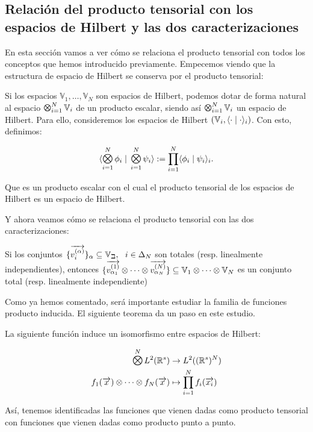 \subsection{Relación del producto tensorial con los espacios de Hilbert y las dos caracterizaciones}

En esta sección vamos a ver cómo se relaciona el producto tensorial con todos los conceptos que hemos introducido previamente. Empecemos viendo que la estructura de espacio de Hilbert se conserva por el producto tensorial:

\begin{proposicion}

	Si los espacios $\mathbb{V}_1, \ldots, \mathbb{V}_N$ son espacios de Hilbert, podemos dotar de forma natural al espacio $\MediumOtimes_{i = 1}^N \mathbb{V}_i$ de un producto escalar, siendo así $\MediumOtimes_{i = 1}^N \mathbb{V}_i$ un espacio de Hilbert. Para ello, consideremos los espacios de Hilbert  $(\mathbb{V}_i, \langle \cdot \; | \; \cdot \rangle_i)$. Con esto, definimos:

	\begin{equation}
		\innerproduct{\MediumOtimes_{i = 1}^{N} \phi_i}{\MediumOtimes_{i = 1}^{N} \psi_i} := \prod_{i = 1}^{N} \innerproduct{\phi_i}{\psi_i}_i.
	\end{equation}

	Que es un producto escalar con el cual el producto tensorial de los espacios de Hilbert es un espacio de Hilbert.

\end{proposicion}

Y ahora veamos cómo se relaciona el producto tensorial con las dos caracterizaciones:

\begin{proposicion}
	Si los conjuntos $\{\overrightarrow{v_i^{(\alpha)}}\}_{\alpha} \subseteq \mathbb{V_i}, \ \  i \in \Delta_{N}$ son totales (resp. linealmente independientes), entonces $\{ \overrightarrow{v^{(1)}_{\alpha_1}} \otimes \cdots \otimes  \overrightarrow{v^{(N)}_{\alpha_N}}  \} \subseteq \mathbb{V}_1 \otimes \cdots \otimes \mathbb{V}_N$ es un conjunto total (resp. linealmente independiente)
\end{proposicion}

Como ya hemos comentado, será importante estudiar la familia de funciones producto inducida. El siguiente teorema da un paso en este estudio.

\begin{teorema}
	La siguiente función induce un isomorfismo entre espacios de Hilbert:

	\begin{equation}
		\begin{split}
			\MediumOtimes^{N} L^2(\R^s) &\to L^2((\R^s)^N) \\
			f_1(\nv{x}) \otimes \cdots \otimes f_N(\nv{x}) &\mapsto \prod_{i = 1}^N f_i(\nv{x_i})
		\end{split}
	\end{equation}

	Así, tenemos identificadas las funciones que vienen dadas como producto tensorial con funciones que vienen dadas como producto punto a punto.
\end{teorema}

